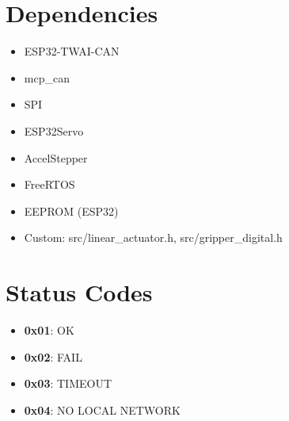 \documentclass{article}
\begin{document}
\section{Dependencies}
\begin{itemize}
    \item ESP32-TWAI-CAN
    \item mcp\_can
    \item SPI
    \item ESP32Servo
    \item AccelStepper
    \item FreeRTOS
    \item EEPROM (ESP32)
    \item Custom: src/linear\_actuator.h, src/gripper\_digital.h
\end{itemize}

\section{Status Codes}
\begin{itemize}
    \item \textbf{0x01}: OK
    \item \textbf{0x02}: FAIL
    \item \textbf{0x03}: TIMEOUT
    \item \textbf{0x04}: NO LOCAL NETWORK
\end{itemize}
\end{document}
